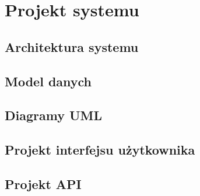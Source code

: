 %


\sloppy

\chapter{Projekt systemu}
\label{rozdzial3}

\section{Architektura systemu}

\section{Model danych}

\section{Diagramy UML}

\section{Projekt interfejsu użytkownika}

\section{Projekt API}
